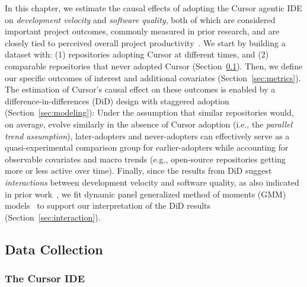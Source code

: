 In this chapter, we estimate the causal effects of adopting the Cursor agentic IDE on \emph{development velocity} and \emph{software quality}, both of which are considered important project outcomes, commonly measured in prior research, and are closely tied to perceived overall project productivity~\cite{DBLP:journals/queue/ForsgrenSMZHB21, DBLP:journals/ese/OliveiraFSCCG20, DBLP:conf/sigsoft/ChengMCJGKZ022}.
We start by building a dataset with: (1) repositories adopting Cursor at different times, and (2) comparable repositories that never adopted Cursor (Section~\ref{sec:cursor-data-collection}).
Then, we define our specific outcomes of interest and additional covariates (Section~\ref{sec:metrics}).
The estimation of Cursor's causal effect on these outcomes is enabled by a difference-in-differences (DiD) design with staggered adoption~\cite{borusyak2024revisiting} (Section~\ref{sec:modeling}): Under the assumption that similar repositories would, on average, evolve similarly in the absence of Cursor adoption (i.e., the \emph{parallel trend assumption}), later-adopters and never-adopters can effectively serve as a quasi-experimental comparison group for earlier-adopters while accounting for observable covariates and macro trends (e.g., open-source repositories getting more or less active over time).
Finally, since the results from DiD suggest \emph{interactions} between development velocity and software quality, as also indicated in prior work~\cite{DBLP:conf/sigsoft/ChengMCJGKZ022, besker2018technical}, we fit dynamic panel generalized method of moments (GMM) models~\cite{arellano1991some} to support our interpretation of the DiD results (Section~\ref{sec:interaction}).

\subsection{Data Collection}
\label{sec:cursor-data-collection}

\subsubsection{The Cursor IDE}
\label{sec:cursor}

